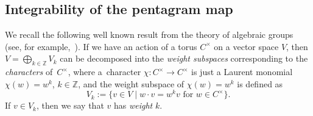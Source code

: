 \documentclass[10pt,a4paper]{amsart}
\numberwithin{equation}{section}
\newcommand{\Z}{{\mathbb Z}}
\newcommand{\C}{{\mathbb C}}
\newcommand{\ra}{\rightarrow}
\def\C{C}
\begin{document}
	
	\subsection{Integrability of the pentagram map}
	
	We recall the following well known result from the theory of algebraic groups (see, for example,~\mbox{\cite[Theorem 3.2.3]{Springer}}). If we have an action of a torus $\C^\times$ on a vector space $V$, then $V=\bigoplus_{k \in \Z} V_k$ can be decomposed into the \textit{weight subspaces} corresponding to the \textit{characters} of~$\C^\times$, where a~character $\chi\colon \C^\times \ra \C^\times$ is just a Laurent monomial $\chi(w)=w^{k}$, $k \in \Z$, and the weight subspace of $\chi(w)=w^k$ is defined as
	\[
	V_k:=\{v \in V \mid w \cdot v = w^k v \text{ for }w \in \C^\times\}.
	\]
	If $v \in V_k$, then we say that $v$ has \textit{weight} $k$.
	
\end{document}
